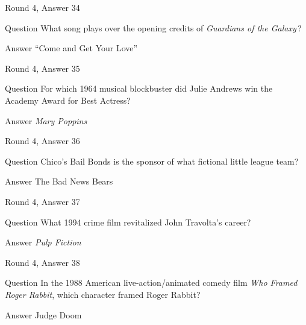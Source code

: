 \documentclass[11pt]{beamer}
\begin{document}
\begin{frame}[t]{Round 4, Answer 34}
\vspace{2em}
\begin{block}{Question}
What song plays over the opening credits of \emph{Guardians of the Galaxy}\,?
\end{block}
\pause{}
\begin{block}{Answer}
``Come and Get Your Love''
\end{block}
\end{frame}
    

\begin{frame}[t]{Round 4, Answer 35}
\vspace{2em}
\begin{block}{Question}
For which 1964 musical blockbuster did Julie Andrews win the Academy Award for Best Actress?
\end{block}
\pause{}
\begin{block}{Answer}
\emph{Mary Poppins}
\end{block}
\end{frame}
    

\begin{frame}[t]{Round 4, Answer 36}
\vspace{2em}
\begin{block}{Question}
Chico's Bail Bonds is the sponsor of what fictional little league team?
\end{block}
\pause{}
\begin{block}{Answer}
The Bad News Bears
\end{block}
\end{frame}
    

\begin{frame}[t]{Round 4, Answer 37}
\vspace{2em}
\begin{block}{Question}
What 1994 crime film revitalized John Travolta's career?
\end{block}
\pause{}
\begin{block}{Answer}
\emph{Pulp Fiction}
\end{block}
\end{frame}
    

\begin{frame}[t]{Round 4, Answer 38}
\vspace{2em}
\begin{block}{Question}
In the 1988 American live-action/animated comedy film \emph{Who Framed Roger Rabbit}, which character framed Roger Rabbit?
\end{block}
\pause{}
\begin{block}{Answer}
Judge Doom
\end{block}
\end{frame}
    
\end{document}
